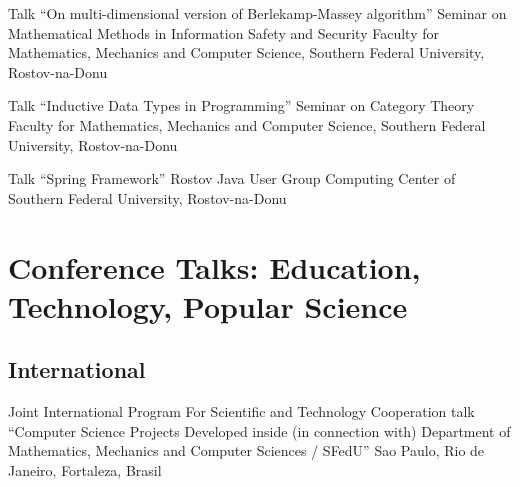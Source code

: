 \documentclass[11pt,a4paper]{moderncv}   %
\newcommand{\MyHrefImpl}[2]{%
\textcolor{blue}{\href{#1}{#2}}}
\def\LINKS{}
\newcommand*{\myhref}[2]{%
\ignorespaces%
\ifdefined\LINKS%
\MyHrefImpl{#1}{#2}%
\else%
#2%
\fi%
}
\begin{document}
{%
    {Talk “On multi-dimensional version of Berlekamp-Massey algorithm”}%
    {Seminar on Mathematical Methods in Information Safety and Security}%
    {Faculty for Mathematics, Mechanics and Computer Science, Southern Federal University, Rostov-na-Donu}%
    {}%
    {%
    }

%
    {Talk “Inductive Data Types in Programming”}%
    {Seminar on Category Theory}%
    {Faculty for Mathematics, Mechanics and Computer Science, Southern Federal University, Rostov-na-Donu}%
    {}%
    {%
    }


%
    {Talk “Spring Framework”}%
    {Rostov Java User Group}%
    {Computing Center of Southern Federal University, Rostov-na-Donu}%
    {}%
    {%
    }
}

\section{Conference Talks: Education, Technology, Popular Science}

\subsection{International}

%
    {Joint International Program For Scientific and Technology Cooperation}%
    {talk “Computer Science Projects Developed inside (in connection with) Department of Mathematics, Mechanics and Computer Sciences / SFedU”}
    {Sao Paulo, Rio de Janeiro, Fortaleza, Brasil}{}%
    {%
    }
\end{document}
